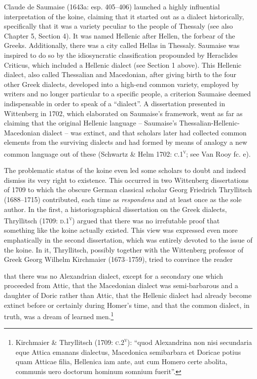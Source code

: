 \begin{styleStandard}
Claude de Saumaise (1643a: esp. 405–406) launched a highly influential interpretation of the koine, claiming that it started out as a dialect historically, specifically that it was a variety peculiar to the people of Thessaly (see also Chapter 5, Section 4). It was named Hellenic after Hellen, the forbear of the Greeks. Additionally, there was a city called Hellas in Thessaly. Saumaise was inspired to do so by the idiosyncratic classification propounded by Heraclides Criticus, which included a Hellenic dialect (see Section 1 above). This Hellenic dialect, also called Thessalian and Macedonian, after giving birth to the four other Greek dialects, developed into a high-end common variety, employed by writers and no longer particular to a specific people, a criterion Saumaise deemed indispensable in order to speak of a “dialect”. A dissertation presented in Wittenberg in 1702, which elaborated on Saumaise’s framework, went as far as claiming that the original Hellenic language – Saumaise’s Thessalian-Hellenic-Macedonian dialect – was extinct, and that scholars later had collected common elements from the surviving dialects and had formed by means of analogy a new common language out of these (Schwartz \& Helm 1702: \textsc{c}.1\textsc{\textsuperscript{v}}; see Van Rooy fc. e)\textsc{.}
\end{styleStandard}

\begin{styleStandard}
The problematic status of the koine even led some scholars to doubt and indeed dismiss its very right to existence. This occurred in two Wittenberg dissertations of 1709 to which the obscure German classical scholar Georg Friedrich Thryllitsch (1688–1715) contributed, each time as \textit{respondens} and at least once as the sole author. In the first, a historiographical dissertation on the Greek dialects, Thryllitsch (1709: \textsc{d.1}\textsc{\textsuperscript{v}}) argued that there was no irrefutable proof that something like the koine actually existed. This view was expressed even more emphatically in the second dissertation, which was entirely devoted to the issue of the koine. In it, Thryllitsch, possibly together with the Wittenberg professor of Greek Georg Wilhelm Kirchmaier (1673–1759), tried to convince the reader
\end{styleStandard}

\begin{styleQuote}
that there was no Alexandrian dialect, except for a secondary one which proceeded from Attic, that the Macedonian dialect was semi-barbarous and a daughter of Doric rather than Attic, that the Hellenic dialect had already become extinct before or certainly during Homer’s time, and that the common dialect, in truth, was a dream of learned men.\footnote{ Kirchmaier \& Thryllitsch (1709: \textsc{c.2}\textsc{\textsuperscript{v}}): “quod Alexandrina non nisi secundaria eque Attica emanans dialectus, Macedonica semibarbara et Doricae potius quam Atticae filia, Hellenica iam ante, aut cum Homero certe abolita, communis uero doctorum hominum somnium fuerit”.}
\end{styleQuote}

